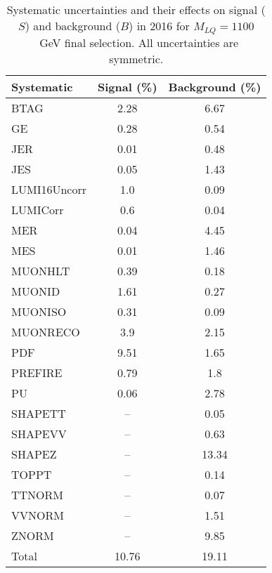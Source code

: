 \begin{table}[htbp]
\begin{center}
\caption{Systematic uncertainties and their effects on signal ($S$) and background ($B$) in 2016 for $M_{LQ}=1100$~GeV final selection. All uncertainties are symmetric.}
\begin{tabular}{lcc}
\hline\hline
Systematic & Signal (\%) & Background (\%) \\ \hline 
BTAG & 2.28 & 6.67\\ 
GE & 0.28 & 0.54\\ 
JER & 0.01 & 0.48\\ 
JES & 0.05 & 1.43\\ 
LUMI16Uncorr & 1.0 & 0.09\\ 
LUMICorr & 0.6 & 0.04\\ 
MER & 0.04 & 4.45\\ 
MES & 0.01 & 1.46\\ 
MUONHLT & 0.39 & 0.18\\ 
MUONID & 1.61 & 0.27\\ 
MUONISO & 0.31 & 0.09\\ 
MUONRECO & 3.9 & 2.15\\ 
PDF & 9.51 & 1.65\\ 
PREFIRE & 0.79 & 1.8\\ 
PU & 0.06 & 2.78\\ 
SHAPETT & -- & 0.05\\ 
SHAPEVV & -- & 0.63\\ 
SHAPEZ & -- & 13.34\\ 
TOPPT & -- & 0.14\\ 
TTNORM & -- & 0.07\\ 
VVNORM & -- & 1.51\\ 
ZNORM & -- & 9.85\\ 
Total & 10.76 & 19.11\\ \hline \hline
\end{tabular}
\label{tab:SysUncertainties_uujj_1100}
\end{center}
\end{table}

